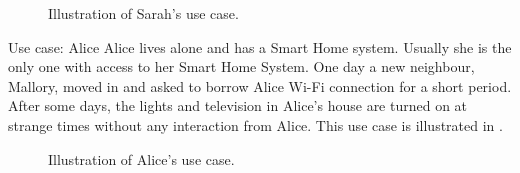 \begin{figure}[H]
     \caption{\label{fig:use-case-3} Illustration of Sarah's use case.}
\end{figure}

\begin{colbox}{Use case: Alice}
Alice lives alone and has a Smart Home system. Usually she is the only one with access to her Smart Home System. One day a new neighbour, Mallory, moved in and asked to borrow Alice Wi-Fi connection for a short period. After some days, the lights and television in Alice's house are turned on at strange times without any interaction from Alice. This use case is illustrated in .
\end{colbox}

\begin{figure}[H]
     \caption{\label{fig:use-case-4} Illustration of Alice's use case.}
\end{figure}


